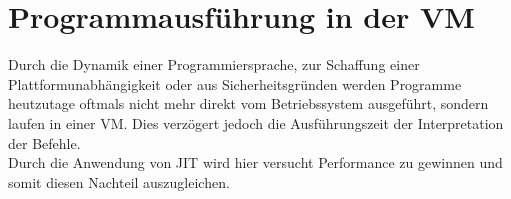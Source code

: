 
\section{Programmausführung in der \ac{VM}}
Durch die Dynamik einer Programmiersprache, zur Schaffung einer Plattformunabhängigkeit oder aus Sicherheitsgründen werden Programme heutzutage oftmals nicht mehr direkt vom Betriebssystem ausgeführt, sondern laufen in einer \ac{VM}. Dies verzögert jedoch die Ausführungszeit der Interpretation der Befehle. \\
Durch die Anwendung von \ac{JIT} wird hier versucht Performance zu gewinnen und somit diesen Nachteil auszugleichen.

